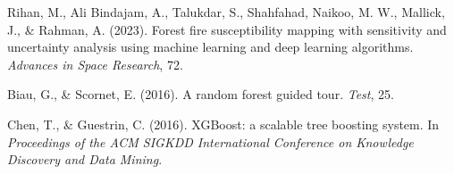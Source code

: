 \documentclass[12pt,a4paper,twocolumn]{article}
\begin{document}
\begin{enumerate}[label={[\arabic*]}, leftmargin=*, itemsep=4pt]
\item Rihan, M., Ali Bindajam, A., Talukdar, S., Shahfahad, Naikoo, M. W., Mallick,
J., \& Rahman, A. (2023). Forest fire susceptibility mapping with sensitivity and
uncertainty analysis using machine learning and deep learning algorithms.
\emph{Advances in Space Research}, 72.

\item Biau, G., \& Scornet, E. (2016). A random forest guided tour. \emph{Test}, 25.

\item Chen, T., \& Guestrin, C. (2016). XGBoost: a scalable tree boosting system. In
\emph{Proceedings of the ACM SIGKDD International Conference on Knowledge Discovery
and Data Mining}.

\end{enumerate}
\end{document}
